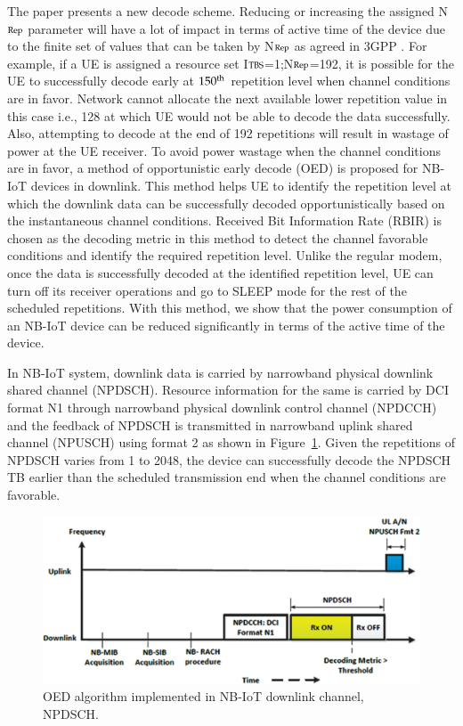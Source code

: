 \begin{multicols}{2}
The paper \cite{art1-key28} presents a new decode scheme. Reducing or increasing the assigned N$\scriptsize{\text{Rep}}$ parameter will have a lot of impact in terms of active time of the device due to the finite set of values that can be taken by N$\scriptsize{\text{Rep}}$ as agreed in 3GPP \cite{art1-key27}. For example, if a UE is assigned a resource set I$\scriptsize{\text{TBS}}$=1;N$\scriptsize{\text{Rep}}$=192, it is possible for the UE to successfully decode early at $150^{\scriptsize{\text{th}}}$ repetition level when channel conditions are in favor. Network cannot allocate the next available lower repetition value in this case i.e., 128 at which UE would not be able to decode the data successfully. Also, attempting to decode at the end of 192 repetitions will result in wastage of power at the UE receiver. To avoid power wastage when the channel conditions are in favor, a method of opportunistic early decode (OED) is proposed for NB-IoT devices in downlink. This method helps UE to identify the repetition level at which the downlink data can be successfully decoded opportunistically based on the instantaneous channel conditions. Received Bit Information Rate (RBIR) is chosen as the decoding metric in this method to detect the channel favorable conditions and identify the required repetition level. Unlike the regular modem, once the data is successfully decoded at the identified repetition level, UE can turn off its receiver operations and go to SLEEP mode for the rest of the scheduled repetitions. With this method, we show that the power consumption of an NB-IoT device can be reduced significantly in terms of the active time of the device. 

In NB-IoT system, downlink data is carried by narrowband physical downlink shared channel (NPDSCH). Resource information for the same is carried by DCI format N1 through narrowband physical downlink control channel (NPDCCH) and the feedback of NPDSCH is transmitted in narrowband uplink shared channel (NPUSCH) using format 2 as shown in Figure~\ref{chap1-fig08}. Given the repetitions of NPDSCH varies from 1 to 2048, the device can successfully decode the NPDSCH TB earlier than the scheduled transmission end when the channel conditions are favorable.

\begin{figure}[H]
\centering
\includegraphics[scale=.9]{src/Figures/chap1/chap1-fig08.jpg}
\caption{OED algorithm implemented in NB-IoT downlink channel, NPDSCH.}\label{chap1-fig08}
\end{figure}


\end{multicols}
